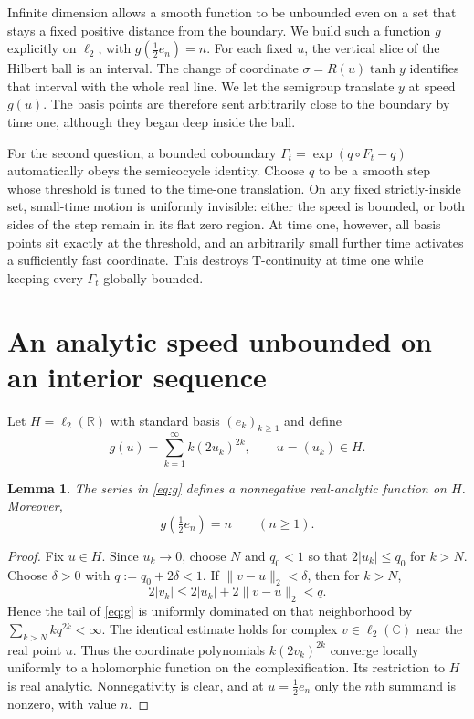 \documentclass[11pt]{article}
\newtheorem{lemma}{Lemma}
\newcommand{\R}{\mathbb R}
\newcommand{\C}{\mathbb C}
\begin{document}
Infinite dimension allows a smooth function to be unbounded even on a set that
stays a fixed positive distance from the boundary. We build such a function
$g$ explicitly on $\ell_2$, with $g(\frac12e_n)=n$. For each fixed $u$, the
vertical slice of the Hilbert ball is an interval. The change of coordinate
$\sigma=R(u)\tanh y$ identifies that interval with the whole real line. We let
the semigroup translate $y$ at speed $g(u)$. The basis points are therefore
sent arbitrarily close to the boundary by time one, although they began deep
inside the ball.

For the second question, a bounded coboundary
$\Gamma_t=\exp(q\circ F_t-q)$ automatically obeys the semicocycle identity.
Choose $q$ to be a smooth step whose threshold is tuned to the time-one
translation. On any fixed strictly-inside set, small-time motion is uniformly
invisible: either the speed is bounded, or both sides of the step remain in its
flat zero region. At time one, however, all basis points sit exactly at the
threshold, and an arbitrarily small further time activates a sufficiently fast
coordinate. This destroys T-continuity at time one while keeping every
$\Gamma_t$ globally bounded.

\section{An analytic speed unbounded on an interior sequence}

Let $H=\ell_2(\R)$ with standard basis $(e_k)_{k\geq1}$ and define
\begin{equation}\label{eq:g}
 g(u)=\sum_{k=1}^{\infty} k(2u_k)^{2k},\qquad u=(u_k)\in H.
\end{equation}

\begin{lemma}\label{lem:g}
The series in \eqref{eq:g} defines a nonnegative real-analytic function on
$H$. Moreover,
\[
 g\!\left(\tfrac12e_n\right)=n\qquad(n\geq1).
\]
\end{lemma}

\begin{proof}
Fix $u\in H$. Since $u_k\to0$, choose $N$ and $q_0<1$ so that
$2|u_k|\leq q_0$ for $k>N$. Choose $\delta>0$ with
$q:=q_0+2\delta<1$. If $\|v-u\|_2<\delta$, then for $k>N$,
\[
 2|v_k|\leq2|u_k|+2\|v-u\|_2<q.
\]
Hence the tail of \eqref{eq:g} is uniformly dominated on that neighborhood by
$\sum_{k>N}kq^{2k}<\infty$. The identical estimate holds for complex
$v\in\ell_2(\C)$ near the real point $u$. Thus the coordinate polynomials
$k(2v_k)^{2k}$ converge locally uniformly to a holomorphic function on the
complexification. Its restriction to $H$ is real analytic. Nonnegativity is
clear, and at $u=\frac12e_n$ only the $n$th summand is nonzero, with value
$n$.
\end{proof}
\end{document}
